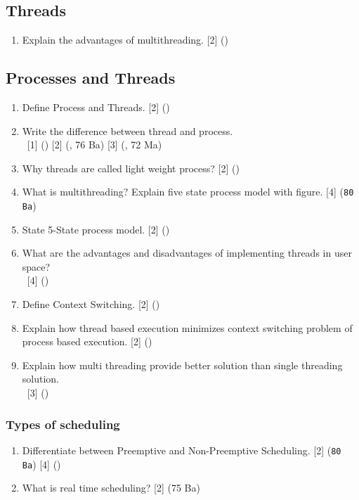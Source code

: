 \documentclass[12pt]{article}
\newcommand{\enter}{\\\textcolor{white}{1}}
\begin{document}
	\subsection{Threads}
	\begin{enumerate}[noitemsep, topsep = 0pt]
		\item Explain the advantages of multithreading. \hfill [2] ()
	\end{enumerate}
	\subsection{Processes and Threads}
	\begin{enumerate}[noitemsep, topsep = 0pt]
		\item Define Process and Threads. \hfill [2] ()
		
		\item Write the difference between thread and process. 
		\enter\hfill [1] () [2] (, 76 Ba) [3] (, 72 Ma)
		
		\item Why threads are called light weight process? \hfill [2] ()
		
		\item What is multithreading? Explain five state process model with figure. \hfill [4] (\texttt{80 Ba})
		
		\item State 5-State process model. \hfill [2] ()
		
		\item What are the advantages and disadvantages of implementing threads in user space?
		\enter \hfill [4] ()
		
		\item Define Context Switching. \hfill [2] ()
		
		\item Explain how thread based execution minimizes context switching problem of process based execution. \hfill [2] ()
		
		\item Explain how multi threading provide better solution than single threading solution.
		\enter \hfill [3] ()
	\end{enumerate}
	\subsubsection{Types of scheduling}
	\begin{enumerate}[noitemsep, topsep = 0pt]
		\item Differentiate between Preemptive and Non-Preemptive Scheduling. \hfill [2] (\texttt{80 Ba}) [4] ()
		
		\item What is real time scheduling? \hfill [2] (75 Ba)
	\end{enumerate}
\end{document}
